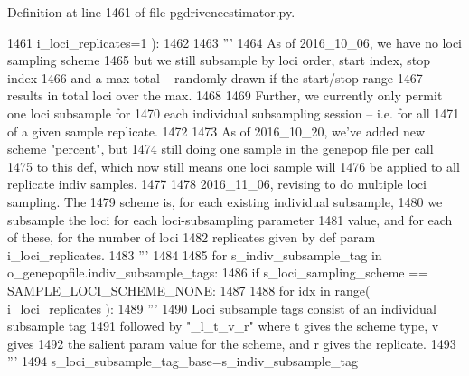 Definition at line 1461 of file pgdriveneestimator.\+py.


\begin{DoxyCode}
1461                         i\_loci\_replicates=1 ):
1462         
1463     \textcolor{stringliteral}{'''}
1464 \textcolor{stringliteral}{    As of 2016\_10\_06, we have no loci sampling scheme}
1465 \textcolor{stringliteral}{    but we still subsample by loci order, start index, stop index}
1466 \textcolor{stringliteral}{    and a max total -- randomly drawn if the start/stop range}
1467 \textcolor{stringliteral}{    results in total loci over the max. }
1468 \textcolor{stringliteral}{}
1469 \textcolor{stringliteral}{    Further, we currently only permit one loci subsample for}
1470 \textcolor{stringliteral}{    each individual subsampling session -- i.e. for all }
1471 \textcolor{stringliteral}{    of a given sample replicate.}
1472 \textcolor{stringliteral}{}
1473 \textcolor{stringliteral}{    As of 2016\_10\_20, we've added new scheme "percent", but}
1474 \textcolor{stringliteral}{    still doing one sample in the genepop file per call}
1475 \textcolor{stringliteral}{    to this def, which now still means one loci sample will}
1476 \textcolor{stringliteral}{    be applied to all replicate indiv samples.}
1477 \textcolor{stringliteral}{}
1478 \textcolor{stringliteral}{    2016\_11\_06, revising to do multiple loci sampling.  The}
1479 \textcolor{stringliteral}{    scheme is, for each existing individual subsample,}
1480 \textcolor{stringliteral}{    we subsample the loci for each loci-subsampling parameter}
1481 \textcolor{stringliteral}{    value, and for each of these, for the number of loci}
1482 \textcolor{stringliteral}{    replicates given by def param i\_loci\_replicates.}
1483 \textcolor{stringliteral}{    '''}
1484 
1485     \textcolor{keywordflow}{for} s\_indiv\_subsample\_tag \textcolor{keywordflow}{in} o\_genepopfile.indiv\_subsample\_tags:
1486         \textcolor{keywordflow}{if} s\_loci\_sampling\_scheme == SAMPLE\_LOCI\_SCHEME\_NONE:
1487 
1488             \textcolor{keywordflow}{for} idx \textcolor{keywordflow}{in} range( i\_loci\_replicates ):
1489                 \textcolor{stringliteral}{'''}
1490 \textcolor{stringliteral}{                Loci subsample tags consist of an individual subsample tag}
1491 \textcolor{stringliteral}{                followed by "\_l\_t\_v\_r" where t gives the scheme type, v gives}
1492 \textcolor{stringliteral}{                the salient param value for the scheme, and r gives the replicate.}
1493 \textcolor{stringliteral}{                '''}
1494                 s\_loci\_subsample\_tag\_base=s\_indiv\_subsample\_tag

\end{DoxyCode}
